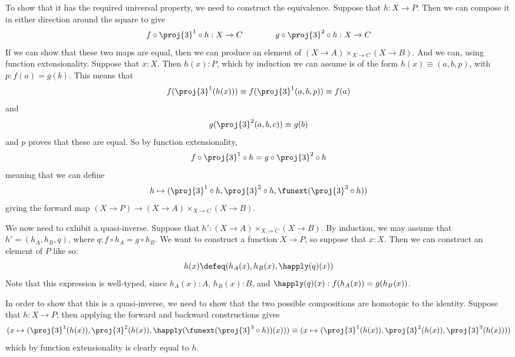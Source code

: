 To show that it has the required universal property, we need to construct the
equivalence.  Suppose that $h : X \to P$.  Then we can compose it in either
direction around the square to give
\[
  f \circ \proj{3}^{1} \circ h : X \to C
  \qquad\qquad
  g \circ \proj{3}^{2} \circ h : X \to C
\]
If we can show that these two maps are equal, then we can produce an element of
$(X \to A) \times_{X \to C} (X \to B)$.  And we can, using function
extensionality.  Suppose that $x:X$.  Then $h(x) : P$, which by induction we
can assume is of the form $h(x) \equiv (a, b, p)$, with $p : f(a) = g(b)$.
This means that
\[
 f(\proj{3}^{1}(h(x))) \equiv f(\proj{3}^{1}(a, b, p)) \equiv f(a)
\]
and
\[
  g(\proj{3}^{2}(a, b, c)) \equiv g(b)
\]
and $p$ proves that these are equal.  So by function extensionality,
\[
  f \circ \proj{3}^{1} \circ h = g \circ \proj{3}^{2} \circ h
\]
meaning that we can define
\[
  h \mapsto (\proj{3}^{1} \circ h, \proj{3}^{2} \circ h, \funext(\proj{3}^{3}
  \circ h))
\]
giving the forward map $(X \to P) \to (X \to A) \times_{X \to C} (X \to B)$.


We now need to exhibit a quasi-inverse.  Suppose that $h' : (X \to A)
\times_{X \to C} (X \to B)$.  By induction, we may assume that $h' = (h_{A},
h_{B}, q)$, where $q : f \circ h_{A} = g \circ h_{B}$.  We want to construct a
function $X \to P$, so suppose that $x:X$.  Then we can construct an element of
$P$ like so:
\[
  h(x) \defeq (h_{A}(x), h_{B}(x), \happly(q)(x))
\]
Note that this expression is well-typed, since $h_{A}(x) : A$, $h_{B}(x) : B$,
and $\happly(q)(x) : f(h_{A}(x)) = g(h_{B}(x))$.


In order to show that this is a quasi-inverse, we need to show that the two
possible compositions are homotopic to the identity.  Suppose that $h : X \to
P$; then applying the forward and backward constructions gives
\[
  (x \mapsto (\proj{3}^{1}(h(x)), \proj{3}^{2}(h(x)),
  \happly(\funext(\proj{3}^{3} \circ h))(x)))
  \equiv
  (x \mapsto (\proj{3}^{1}(h(x)), \proj{3}^{2}(h(x)), \proj{3}^{3}(h(x))))
\]
which by function extensionality is clearly equal to $h$.


